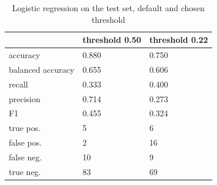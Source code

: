 \begin{table}[htbp]
\centering
\caption{Logistic regression on the test set, default and chosen threshold}
\label{tab:q8_test_thresholds}
\begin{tabular}{lll}
\toprule
 & threshold 0.50 & threshold 0.22 \\
\midrule
accuracy & 0.880 & 0.750 \\
balanced accuracy & 0.655 & 0.606 \\
recall & 0.333 & 0.400 \\
precision & 0.714 & 0.273 \\
F1 & 0.455 & 0.324 \\
true pos. & 5 & 6 \\
false pos. & 2 & 16 \\
false neg. & 10 & 9 \\
true neg. & 83 & 69 \\
\bottomrule
\end{tabular}
\end{table}
